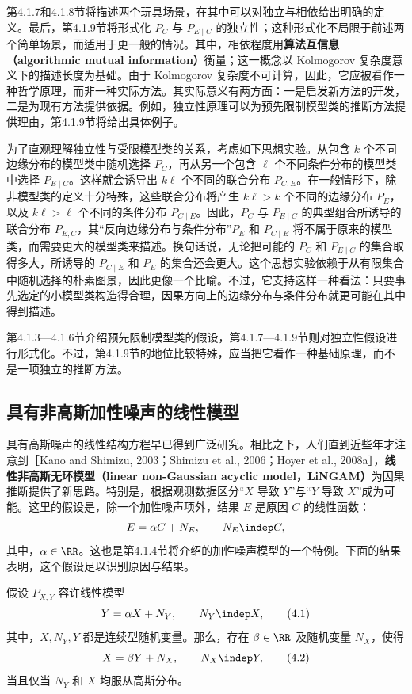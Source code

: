 第4.1.7和4.1.8节将描述两个玩具场景，在其中可以对独立与相依给出明确的定义。最后，第4.1.9节将形式化 $P_C$ 与 $P_{E\mid C}$ 的独立性；这种形式化不局限于前述两个简单场景，而适用于更一般的情况。其中，相依程度用\textbf{算法互信息（algorithmic mutual information）}衡量；这一概念以 Kolmogorov 复杂度意义下的描述长度为基础。由于 Kolmogorov 复杂度不可计算，因此，它应被看作一种哲学原理，而非一种实际方法。其实际意义有两方面：一是启发新方法的开发，二是为现有方法提供依据。例如，独立性原理可以为预先限制模型类的推断方法提供理由，第4.1.9节将给出具体例子。

为了直观理解独立性与受限模型类的关系，考虑如下思想实验。从包含 $k$ 个不同边缘分布的模型类中随机选择 $P_C$，再从另一个包含 $\ell$ 个不同条件分布的模型类中选择 $P_{E\mid C}$。这样就会诱导出 $k\ell$ 个不同的联合分布 $P_{C,E}$。在一般情形下，除非模型类的定义十分特殊，这些联合分布将产生 $k\ell>k$ 个不同的边缘分布 $P_E$，以及 $k\ell>\ell$ 个不同的条件分布 $P_{C\mid E}$。因此，$P_C$ 与 $P_{E\mid C}$ 的典型组合所诱导的联合分布 $P_{E,C}$，其“反向边缘分布与条件分布”$P_E$ 和 $P_{C\mid E}$ 将不属于原来的模型类，而需要更大的模型类来描述。换句话说，无论把可能的 $P_C$ 和 $P_{E\mid C}$ 的集合取得多大，所诱导的 $P_{C\mid E}$ 和 $P_E$ 的集合还会更大。这个思想实验依赖于从有限集合中随机选择的朴素图景，因此更像一个比喻。不过，它支持这样一种看法：只要事先选定的小模型类构造得合理，因果方向上的边缘分布与条件分布就更可能在其中得到描述。

第4.1.3—4.1.6节介绍预先限制模型类的假设，第4.1.7—4.1.9节则对独立性假设进行形式化。不过，第4.1.9节的地位比较特殊，应当把它看作一种基础原理，而不是一项独立的推断方法。

\subsection{具有非高斯加性噪声的线性模型}

具有高斯噪声的线性结构方程早已得到广泛研究。相比之下，人们直到近些年才注意到［Kano and Shimizu, 2003；Shimizu et al., 2006；Hoyer et al., 2008a］，\textbf{线性非高斯无环模型（linear non-Gaussian acyclic model，LiNGAM）}为因果推断提供了新思路。特别是，根据观测数据区分“$X$ 导致 $Y$”与“$Y$ 导致 $X$”成为可能。这里的假设是，除一个加性噪声项外，结果 $E$ 是原因 $C$ 的线性函数：
\[
 E=\alpha C+N_E,\qquad N_E\indep C,
\]
其中，$\alpha\in\RR$。这也是第4.1.4节将介绍的加性噪声模型的一个特例。下面的结果表明，这个假设足以识别原因与结果。

\begin{theorem}[线性非高斯模型的可识别性]
假设 $P_{X,Y}$ 容许线性模型
\begin{equation}
 Y=\alpha X+N_Y,\qquad N_Y\indep X,
 \tag{4.1}
\end{equation}
其中，$X,N_Y,Y$ 都是连续型随机变量。那么，存在 $\beta\in\RR$ 及随机变量 $N_X$，使得
\begin{equation}
 X=\beta Y+N_X,\qquad N_X\indep Y,
 \tag{4.2}
\end{equation}
当且仅当 $N_Y$ 和 $X$ 均服从高斯分布。
\end{theorem}

